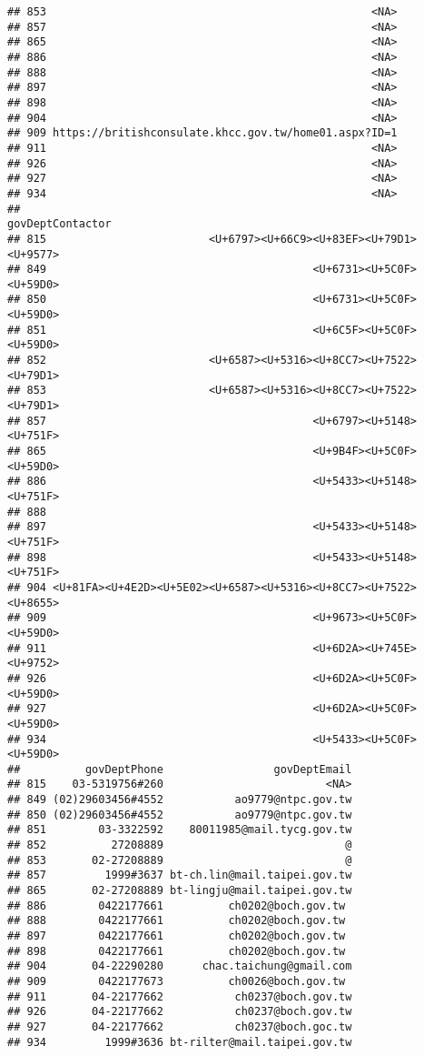 \documentclass[
]{article}
\begin{document}
\begin{verbatim}
## 853                                                  <NA>
## 857                                                  <NA>
## 865                                                  <NA>
## 886                                                  <NA>
## 888                                                  <NA>
## 897                                                  <NA>
## 898                                                  <NA>
## 904                                                  <NA>
## 909 https://britishconsulate.khcc.gov.tw/home01.aspx?ID=1
## 911                                                  <NA>
## 926                                                  <NA>
## 927                                                  <NA>
## 934                                                  <NA>
##                                                     govDeptContactor
## 815                         <U+6797><U+66C9><U+83EF><U+79D1><U+9577>
## 849                                         <U+6731><U+5C0F><U+59D0>
## 850                                         <U+6731><U+5C0F><U+59D0>
## 851                                         <U+6C5F><U+5C0F><U+59D0>
## 852                         <U+6587><U+5316><U+8CC7><U+7522><U+79D1>
## 853                         <U+6587><U+5316><U+8CC7><U+7522><U+79D1>
## 857                                         <U+6797><U+5148><U+751F>
## 865                                         <U+9B4F><U+5C0F><U+59D0>
## 886                                         <U+5433><U+5148><U+751F>
## 888                                                                 
## 897                                         <U+5433><U+5148><U+751F>
## 898                                         <U+5433><U+5148><U+751F>
## 904 <U+81FA><U+4E2D><U+5E02><U+6587><U+5316><U+8CC7><U+7522><U+8655>
## 909                                         <U+9673><U+5C0F><U+59D0>
## 911                                         <U+6D2A><U+745E><U+9752>
## 926                                         <U+6D2A><U+5C0F><U+59D0>
## 927                                         <U+6D2A><U+5C0F><U+59D0>
## 934                                         <U+5433><U+5C0F><U+59D0>
##          govDeptPhone                 govDeptEmail
## 815    03-5319756#260                         <NA>
## 849 (02)29603456#4552           ao9779@ntpc.gov.tw
## 850 (02)29603456#4552           ao9779@ntpc.gov.tw
## 851        03-3322592    80011985@mail.tycg.gov.tw
## 852          27208889                            @
## 853       02-27208889                            @
## 857         1999#3637 bt-ch.lin@mail.taipei.gov.tw
## 865       02-27208889 bt-lingju@mail.taipei.gov.tw
## 886        0422177661          ch0202@boch.gov.tw 
## 888        0422177661          ch0202@boch.gov.tw 
## 897        0422177661          ch0202@boch.gov.tw 
## 898        0422177661          ch0202@boch.gov.tw 
## 904       04-22290280      chac.taichung@gmail.com
## 909        0422177673          ch0026@boch.gov.tw 
## 911       04-22177662           ch0237@boch.gov.tw
## 926       04-22177662           ch0237@boch.gov.tw
## 927       04-22177662           ch0237@boch.goc.tw
## 934         1999#3636 bt-rilter@mail.taipei.gov.tw
\end{verbatim}
\end{document}
